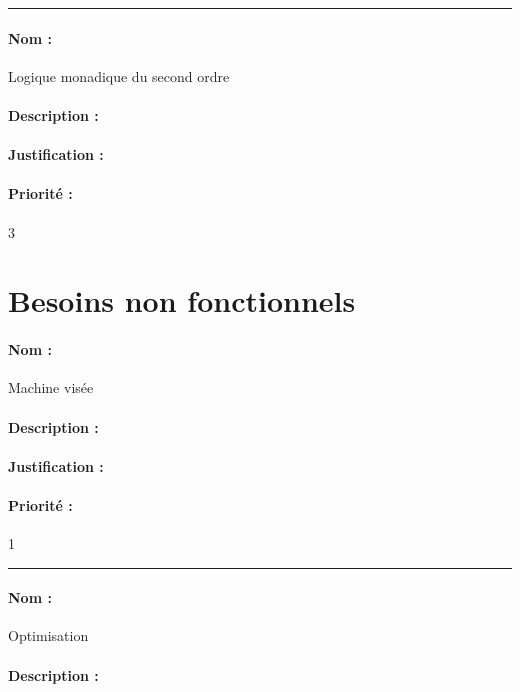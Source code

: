 \documentclass{article}%
\begin{document}
\rule{\linewidth}{1pt}

\paragraph{Nom :} Logique monadique du second ordre

\paragraph{Description :}

\paragraph{Justification :}

\paragraph{Priorité :} 3

\section{Besoins non fonctionnels}

\paragraph{Nom :} Machine visée

\paragraph{Description :}

\paragraph{Justification :}

\paragraph{Priorité :} 1\\

\rule{\linewidth}{1pt}

\paragraph{Nom :} Optimisation

\paragraph{Description :}
\end{document}

